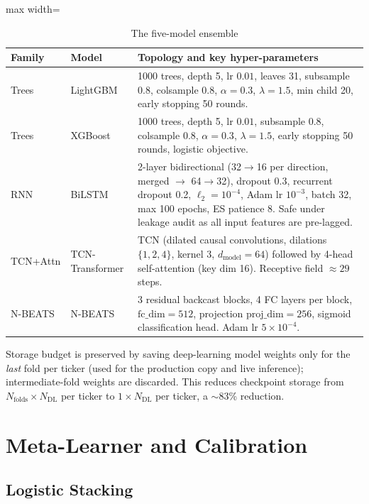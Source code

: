\begin{table}[H]
\centering
\caption{The five-model ensemble}
\label{tab:model_committee}
\renewcommand{\arraystretch}{1.4}
\begin{adjustbox}{max width=\textwidth}
\begin{tabularx}{\textwidth}{l l X}
\toprule
\textbf{Family} & \textbf{Model} & \textbf{Topology and key hyper-parameters} \\
\midrule
Trees   & LightGBM         & 1000 trees, depth 5, lr $0.01$, leaves 31, subsample 0.8, colsample 0.8, $\alpha=0.3$, $\lambda=1.5$, min child 20, early stopping 50 rounds. \\
Trees   & XGBoost          & 1000 trees, depth 5, lr $0.01$, subsample 0.8, colsample 0.8, $\alpha=0.3$, $\lambda=1.5$, early stopping 50 rounds, logistic objective. \\
RNN     & BiLSTM           & 2-layer bidirectional (32$\to$16 per direction, merged $\to$ 64$\to$32), dropout 0.3, recurrent dropout 0.2, $\ell_2=10^{-4}$, Adam lr $10^{-3}$, batch 32, max 100 epochs, ES patience 8. Safe under leakage audit as all input features are pre-lagged. \\
TCN+Attn & TCN-Transformer & TCN (dilated causal convolutions, dilations $\{1,2,4\}$, kernel 3, $d_\mathrm{model}=64$) followed by 4-head self-attention (key dim 16). Receptive field $\approx 29$ steps. \\
N-BEATS & N-BEATS          & 3 residual backcast blocks, 4 FC layers per block, $\mathrm{fc\_dim}=512$, projection $\mathrm{proj\_dim}=256$, sigmoid classification head. Adam lr $5 \times 10^{-4}$. \\
\bottomrule
\end{tabularx}
\end{adjustbox}
\end{table}

Storage budget is preserved by saving deep-learning model weights only for the \emph{last} fold per ticker (used for the production copy and live inference); intermediate-fold weights are discarded. This reduces checkpoint storage from $N_\mathrm{folds} \times N_\mathrm{DL}$ per ticker to $1 \times N_\mathrm{DL}$ per ticker, a $\sim$83\% reduction.

\section{Meta-Learner and Calibration}

\subsection{Logistic Stacking}

